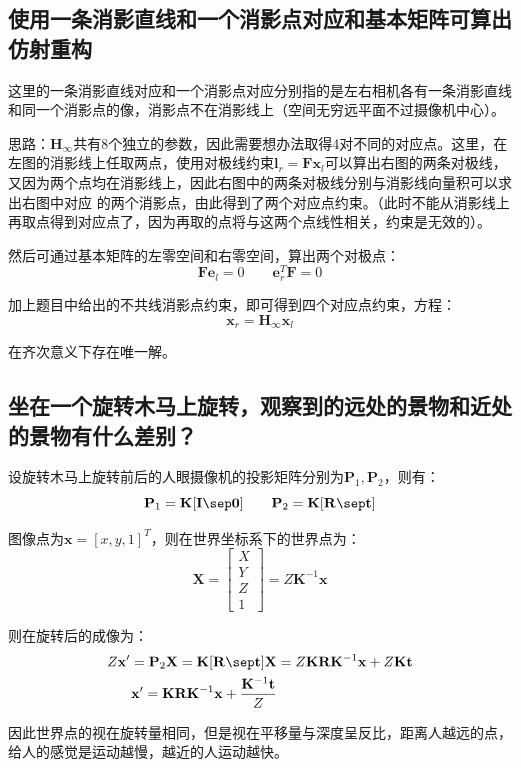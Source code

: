 \documentclass[11pt]{article}
\begin{document}
\subsection{使用一条消影直线和一个消影点对应和基本矩阵可算出仿射重构}
这里的一条消影直线对应和一个消影点对应分别指的是左右相机各有一条消影直线和同一个消影点的像，消影点不在消影线上（空间无穷远平面不过摄像机中心）。\par
思路：$\mathbf{H}_\infty$共有8个独立的参数，因此需要想办法取得4对不同的对应点。这里，在左图的消影线上任取两点，使用对极线约束$\mathbf{l}_r=\mathbf{Fx}_l$可以算出右图的两条对极线，又因为两个点均在消影线上，因此右图中的两条对极线分别与消影线向量积可以求出右图中对应 的两个消影点，由此得到了两个对应点约束。（此时不能从消影线上再取点得到对应点了，因为再取的点将与这两个点线性相关，约束是无效的）。\par
然后可通过基本矩阵的左零空间和右零空间，算出两个对极点：
\begin{equation*}
  \mathbf{Fe}_l=0\qquad\mathbf{e}_r^T\mathbf{F}=0
\end{equation*}\par
加上题目中给出的不共线消影点约束，即可得到四个对应点约束，方程：
\begin{equation*}
  \mathbf{x}_r=\mathbf{H}_\infty \mathbf{x}_l
\end{equation*}\par
在齐次意义下存在唯一解。
\subsection{坐在一个旋转木马上旋转，观察到的远处的景物和近处的景物有什么差别？}
\par
设旋转木马上旋转前后的人眼摄像机的投影矩阵分别为$\mathbf{P}_1,\mathbf{P}_2$，则有：
\begin{equation*}
  \mathbf{P}_1=\mathbf{K[I\sep 0]}\qquad\mathbf{P}_2=\mathbf{K[R\sep t ]} 
\end{equation*}\par
图像点为$\mathbf{x}=[x,y,1]^T$，则在世界坐标系下的世界点为：
\begin{equation*}
  \mathbf{X}=\begin{bmatrix}
    X \\Y\\Z\\1
  \end{bmatrix}=Z\mathbf{K^\mathrm{-1}x}
\end{equation*}\par
则在旋转后的成像为：
\begin{align*}
  Z\mathbf{x}'=\mathbf{P}_2\mathbf{X}=\mathbf{K[R\sep t ]}\mathbf{X}&=Z\mathbf{KRK^\mathrm{-1}x}+Z\mathbf{Kt}\\
  \mathbf{x}'=\mathbf{KRK^\mathrm{-1}x}+\frac{\mathbf{K^\mathrm{-1}t}}{Z}
\end{align*}\par
因此世界点的视在旋转量相同，但是视在平移量与深度呈反比，距离人越远的点，给人的感觉是运动越慢，越近的人运动越快。
\end{document}
